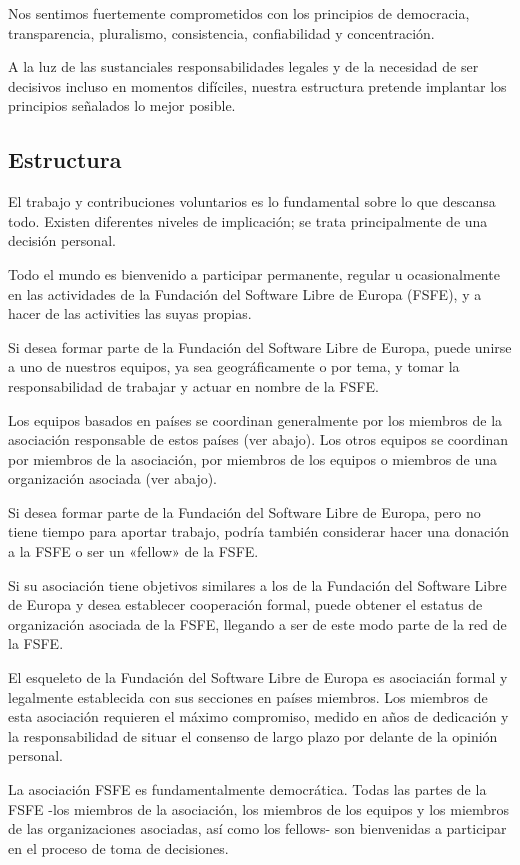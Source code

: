 \documentclass[10pt,foldmark,tumble]{leaflet}
\begin{document}
Nos sentimos fuertemente comprometidos con los principios de democracia, transparencia, pluralismo, consistencia, confiabilidad y concentración.

A la luz de las sustanciales responsabilidades legales y de la necesidad de ser decisivos incluso en momentos difíciles, nuestra estructura pretende implantar los principios señalados lo mejor posible.
  \subsection{Estructura}

El trabajo y contribuciones voluntarios es lo fundamental sobre lo que descansa todo. Existen diferentes niveles de implicación; se trata principalmente de una decisión personal.

Todo el mundo es bienvenido a participar permanente, regular u ocasionalmente en las actividades de la Fundación del Software Libre de Europa (FSFE), y a hacer de las activities las suyas propias.

Si desea formar parte de la Fundación del Software Libre de Europa, puede unirse a uno de nuestros equipos, ya sea geográficamente o por tema, y tomar la responsabilidad de trabajar y actuar en nombre de la FSFE.

Los equipos basados en países se coordinan generalmente por los miembros de la asociación responsable de estos países (ver abajo). Los otros equipos se coordinan por miembros de la asociación, por miembros de los equipos o miembros de una organización asociada (ver abajo).

Si desea formar parte de la Fundación del Software Libre de Europa, pero no tiene tiempo para aportar trabajo, podría también considerar hacer una donación a la FSFE o ser un «fellow» de la FSFE.

Si su asociación tiene objetivos similares a los de la Fundación del Software Libre de Europa y desea establecer cooperación formal, puede obtener el estatus de organización asociada de la FSFE, llegando a ser de este modo parte de la red de la FSFE.

El esqueleto de la Fundación del Software Libre de Europa es asociacián formal y legalmente establecida con sus secciones en países miembros. Los miembros de esta asociación requieren el máximo compromiso, medido en años de dedicación y la responsabilidad de situar el consenso de largo plazo por delante de la opinión personal.

La asociación FSFE es fundamentalmente democrática. Todas las partes de la FSFE -los miembros de la asociación, los miembros de los equipos y los miembros de las organizaciones asociadas, así como los fellows- son bienvenidas a participar en el proceso de toma de decisiones.
\end{document}
